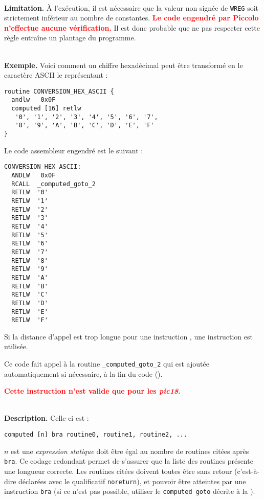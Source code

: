 ~\\
\textbf{Limitation.} À l'exécution, il est nécessaire que la valeur non signée de \texttt{WREG} soit strictement inférieur au nombre de constantes. \textcolor{red}{\bf Le code engendré par Piccolo n'effectue aucune vérification.} Il est donc probable que ne pas respecter cette règle entraîne un plantage du programme.


~\\
\textbf{Exemple.} Voici comment un chiffre hexadécimal peut être transformé en le caractère ASCII le représentant :
\begin{lstlisting}[language=piccolo]
routine CONVERSION_HEX_ASCII {
  andlw   0x0F
  computed [16] retlw
   '0', '1', '2', '3', '4', '5', '6', '7',
   '8', '9', 'A', 'B', 'C', 'D', 'E', 'F'
}
\end{lstlisting}

Le code assembleur engendré est le suivant :
\begin{lstlisting}[language=assembleur]
CONVERSION_HEX_ASCII:
  ANDLW   0x0F
  RCALL  _computed_goto_2
  RETLW  '0'
  RETLW  '1'
  RETLW  '2'
  RETLW  '3'
  RETLW  '4'
  RETLW  '5'
  RETLW  '6'
  RETLW  '7'
  RETLW  '8'
  RETLW  '9'
  RETLW  'A'
  RETLW  'B'
  RETLW  'C'
  RETLW  'D'
  RETLW  'E'
  RETLW  'F'
\end{lstlisting}

Si la distance d'appel est trop longue pour une instruction , une instruction  est utilisée.

Ce code fait appel à la routine \texttt{\_computed\_goto\_2} qui est ajoutée automatiquement si nécessaire, à la fin du code (). 


\textcolor{red}{\bf Cette instruction n'est valide que pour les \emph{pic18}.}

~\\
\textbf{Description.} Celle-ci est :
\begin{lstlisting}[language=piccolo]
computed [n] bra routine0, routine1, routine2, ...
\end{lstlisting}

$n$ est une \emph{expression statique} doit être égal au nombre de routines citées après \texttt{bra}. Ce codage redondant permet de s'assurer que la liste des routines présente une longueur correcte. Les routines citées doivent toutes être sans retour (c'est-à-dire déclarées avec le qualificatif \texttt{noreturn}), et pouvoir être atteintes par une instruction \texttt{bra} (si ce n'est pas possible, utiliser le \texttt{computed goto} décrite à la ).


